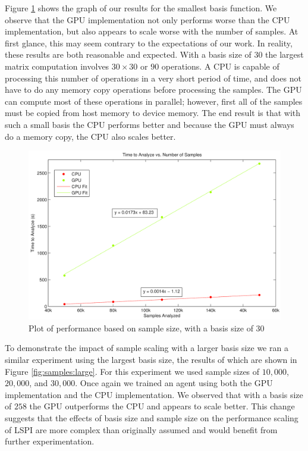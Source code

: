 Figure \ref{fig:samples} shows the graph of our results for the smallest basis function. We observe that the GPU implementation not only performs worse than the CPU implementation, but also appears to scale worse with the number of samples. At first glance, this may seem contrary to the expectations of our work. In reality, these results are both reasonable and expected. With a basis size of $30$ the largest matrix computation involves $30 \times 30$ or $90$ operations. A CPU is capable of processing this number of operations in a very short period of time, and does not have to do any memory copy operations before processing the samples. The GPU can compute most of these operations in parallel; however, first all of the samples must be copied from host memory to device memory. The end result is that with such a small basis the CPU performs better and because the GPU must always do a memory copy, the CPU also scales better.

\begin{figure}
    \centering
	\includegraphics[width=0.6\paperwidth]{Time_vs_Samples.png}
    \caption{Plot of performance based on sample size, with a basis size of 30}
	\label{fig:samples}
\end{figure}

To demonstrate the impact of sample scaling with a larger basis size we ran a similar experiment using the largest basis size, the results of which are shown in Figure \ref{fig:samples:large}. For this experiment we used sample sizes of $10,000$, $20,000$, and $30,000$. Once again we trained an agent using both the GPU implementation and the CPU implementation. We observed that with a basis size of $258$ the GPU outperforms the CPU and appears to scale better. This change suggests that the effects of basis size and sample size on the performance scaling of LSPI are more complex than originally assumed and would benefit from further experimentation.

